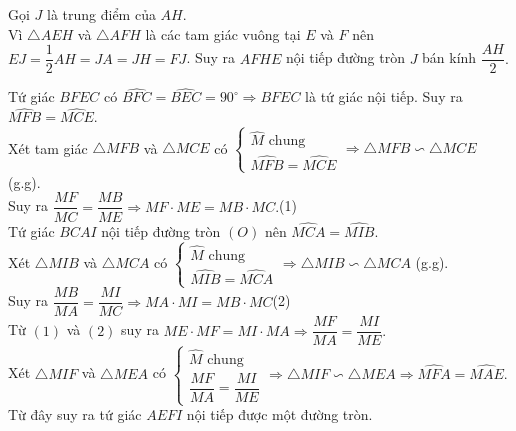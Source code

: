 \begin{bt}
{\begin{center}
		\end{center}
		\begin{listEX}
			\item Gọi $J$ là trung điểm của $AH$. \\
			Vì $\triangle AEH$ và $\triangle AFH$ là các tam giác vuông tại $E$ và $F$ nên $EJ=\dfrac{1}{2}AH=JA=JH=FJ$. Suy ra $AFHE$ nội tiếp đường tròn $J$ bán kính $\dfrac{AH}{2}.$
			\item Tứ giác $BFEC$ có $\widehat{BFC}=\widehat{BEC}=90^\circ\Rightarrow BFEC$ là tứ giác nội tiếp. Suy ra $\widehat{MFB}=\widehat{MCE}$.\\
			Xét tam giác $\triangle MFB$ và $\triangle MCE$ có
			$\begin{cases} \widehat{M} \text{ chung}\\ \widehat{MFB}=\widehat{MCE}\end{cases}\Rightarrow \triangle MFB\backsim \triangle MCE$ (g.g).\\
			Suy ra $\dfrac{MF}{MC}=\dfrac{MB}{ME}\Rightarrow MF\cdot ME=MB\cdot MC.$\hfill(1) \\
			Tứ giác $BCAI$ nội tiếp đường tròn $(O)$ nên $\widehat{MCA}=\widehat{MIB}.$\\
			Xét $\triangle MIB$ và $\triangle MCA$ có $\begin{cases} \widehat{M} \text{ chung}\\ \widehat{MIB}=\widehat{MCA}\end{cases}\Rightarrow \triangle MIB\backsim \triangle MCA$ (g.g).\\
			Suy ra $\dfrac{MB}{MA}=\dfrac{MI}{MC}\Rightarrow MA\cdot MI=MB \cdot MC$\hfill(2)\\
			Từ $(1)$ và $(2)$ suy ra $ME\cdot MF=MI\cdot MA\Rightarrow \dfrac{MF}{MA}=\dfrac{MI}{ME}.$\\
			Xét $\triangle MIF$ và $\triangle MEA$ có $\begin{cases}
			\widehat{M} \text{ chung}\\ \dfrac{MF}{MA}=\dfrac{MI}{ME} 
			\end{cases}\Rightarrow \triangle MIF\backsim \triangle MEA\Rightarrow \widehat{MFA}=\widehat{MAE}.$\\
			Từ đây suy ra tứ giác $AEFI$ nội tiếp được một đường tròn.
		\end{listEX}
	}
\end{bt}

